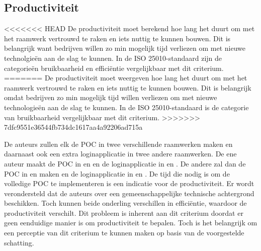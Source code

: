 \subsection{Productiviteit}
\label{sec:vergelijking-productiviteit}
<<<<<<< HEAD
De productiviteit moet berekend hoe lang het duurt om met het raamwerk vertrouwd te raken en iets nuttig te kunnen bouwen.
Dit is belangrijk want bedrijven willen zo min mogelijk tijd verliezen om met nieuwe technolgieën aan de slag te kunnen.
In de ISO 25010-standaard zijn de categorieën bruikbaarheid en efficiëntie vergelijkbaar met dit criterium.
=======
De productiviteit moet weergeven hoe lang het duurt om met het raamwerk vertrouwd te raken en iets nuttig te kunnen bouwen.
Dit is belangrijk omdat bedrijven zo min mogelijk tijd willen verliezen om met nieuwe technologieën aan de slag te kunnen.
In de ISO 25010-standaard is de categorie van bruikbaarheid vergelijkbaar met dit criterium.
>>>>>>> 7dfc9551e36544fb734dc1617aa4a92206ad715a

De auteurs zullen elk de POC in twee verschillende raamwerken maken en daarnaast ook een extra loginapplicatie in twee andere raamwerken.
De ene auteur maakt de POC in \jqm{} en \lungo{} en de loginapplicatie in \st{} en \kendo{}.
De andere zal dan de POC in \st{} en \kendo{} maken en de loginapplicatie in \jqm{} en \lungo{}.
De tijd die nodig is om de volledige POC te implementeren is een indicatie voor de productiviteit. 
Er wordt verondersteld dat de auteurs over een gemeenschappelijke technische achtergrond beschikken.
Toch kunnen beide onderling verschillen in efficiëntie,  waardoor de productiviteit verschilt.
Dit probleem is inherent aan dit criterium doordat er geen eenduidige manier is om productiviteit te bepalen.
Toch is het belangrijk om een perceptie van dit criterium te kunnen maken op basis van de voorgestelde schatting.

% 

